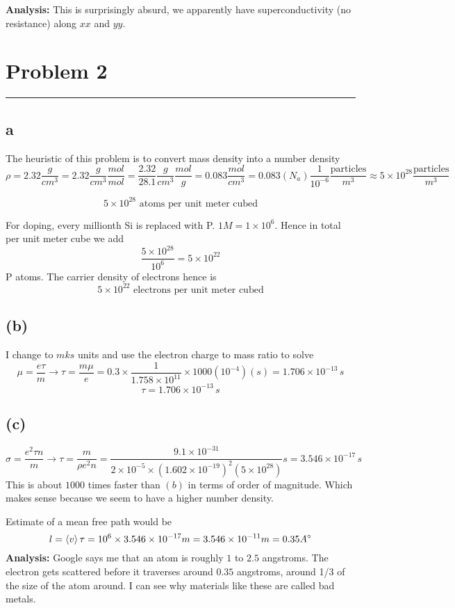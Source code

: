 \documentclass[letter, 10pts]{article}
\begin{document}
\textbf{Analysis:} This is surprisingly absurd, we apparently have superconductivity (no resistance) along $x x$ and $y y $. 




\section*{Problem 2}
\hrule
\subsection*{a}
The heuristic of this problem is to convert mass density into a number density 
\[
\rho = 2.32 \frac{g}{cm^3} = 2.32 \frac{g}{cm ^3 } \frac{mol}{mol} = \frac{2.32}{28.1} \frac{g }{cm ^3} \frac{mol}{g} =   0.083 \frac{mol}{cm ^3} = 0.083 (N_a) \frac{1}{10^{-6}} \frac{\text{particles}}{m^3} 
\approx 5 \times 10^{28} \frac{\text{particles}}{m^3}
\] 

\[
\boxed{
5 \times 10^{28} \text{ atoms per unit meter cubed}
}
\] 

For doping, every millionth Si is replaced with P. $1 M = 1 \times 10^{6}$. Hence in total per unit meter cube we add  
\[
\frac{5 \times 10^{28}}{10^{6}} = 5 \times  10^{22}
\] 
 P atoms. The carrier density of electrons hence is 
 \[
 \boxed{
 5 \times 10^{22 } \text{ electrons per unit meter cubed}
 }
 \] 

 \subsection*{(b)} 
 I change to $m k s$ units and use the electron charge to mass ratio to solve 
 \[
 \mu = \frac{e \tau}{m} \to \tau = \frac{m \mu}{e}  = 0.3 \times  \frac{1}{1.758 \times 10^{11} } \times  1000 (10^{-4} )  (s) = 1.706 \times 10^{-13} \, s
 \]
\[\boxed{
\tau = 1.706 \times  10^{-13} \, s
} \] 


\subsection*{(c)} 
\[
\sigma = \frac{e^2 \tau n}{m} \to \tau = \frac{m}{\rho e^2 n}   = 
\frac{9.1 \times 10^{-31} }{2 \times 10^{-5} \times (1.602 \times 10^{- 1 9 } )^2 (5 \times 10^{28}) } s = 3.546 \times 10^{-17} \, s
\] 
This is about $1000$ times faster than $(b)$ in terms of order of magnitude. Which makes sense because we seem to have a higher number density. 

Estimate of a mean free path would be 
\[
l = \braket{v } \tau = 10^{6} \times 3.546 \times 10^{-17} m = 3.546 \times 10^{-11} m = 0.35 A^{\circ} 
\]
\textbf{Analysis:} Google says me that an atom is roughly $1$ to $2.5$ angstroms. The electron gets scattered before it traverses around $0.35 $ angstroms, around 1/3 of the size of the atom around. I can see why materials like these are called bad metals. 
\end{document}

